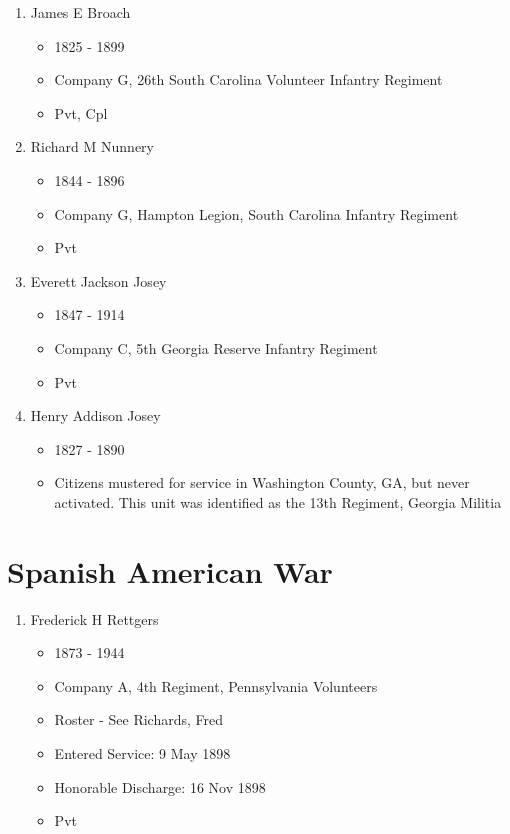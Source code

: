 \documentclass[11pt,letter]{book}
\begin{document}
\begin{enumerate}
\item James E Broach
\begin{itemize}
\item 1825 - 1899
\item Company G, 26th South Carolina Volunteer Infantry Regiment
\item Pvt, Cpl
\end{itemize}

\item Richard M Nunnery
\begin{itemize}
\item 1844 - 1896
\item Company G, Hampton Legion, South Carolina Infantry Regiment
\item Pvt
\end{itemize}

\item Everett Jackson Josey
\begin{itemize}
\item 1847 - 1914
\item Company C, 5th Georgia Reserve Infantry Regiment
\item Pvt
\end{itemize}

\item Henry Addison Josey
\begin{itemize}
\item 1827 - 1890
\item Citizens mustered for service in Washington County, GA, but never activated.  This unit was identified as the 13th Regiment, Georgia Militia
\end{itemize}

\end{enumerate}


\chapter{Spanish American War}

\begin{enumerate}
\item Frederick H Rettgers
\begin{itemize}
\item 1873 - 1944
\item Company A, 4th Regiment, Pennsylvania Volunteers
\item Roster - See Richards, Fred
\item Entered Service:  9 May 1898
\item Honorable Discharge: 16 Nov 1898
\item Pvt
\end{itemize}
\end{enumerate}
\end{document}

